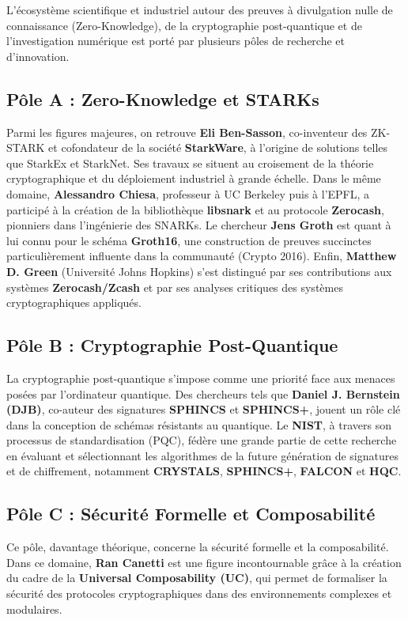 \documentclass[11pt]{article}
\begin{document}
L’écosystème scientifique et industriel autour des preuves à divulgation nulle de connaissance (Zero-Knowledge), de la cryptographie post-quantique et de l’investigation numérique est porté par plusieurs pôles de recherche et d’innovation.  

\subsection{Pôle A : Zero-Knowledge et STARKs}
Parmi les figures majeures, on retrouve \textbf{Eli Ben-Sasson}, co-inventeur des ZK-STARK et cofondateur de la société \textbf{StarkWare}, à l’origine de solutions telles que StarkEx et StarkNet. Ses travaux se situent au croisement de la théorie cryptographique et du déploiement industriel à grande échelle. Dans le même domaine, \textbf{Alessandro Chiesa}, professeur à UC Berkeley puis à l’EPFL, a participé à la création de la bibliothèque \textbf{libsnark} et au protocole \textbf{Zerocash}, pionniers dans l’ingénierie des SNARKs. Le chercheur \textbf{Jens Groth} est quant à lui connu pour le schéma \textbf{Groth16}, une construction de preuves succinctes particulièrement influente dans la communauté (Crypto 2016). Enfin, \textbf{Matthew D. Green} (Université Johns Hopkins) s’est distingué par ses contributions aux systèmes \textbf{Zerocash/Zcash} et par ses analyses critiques des systèmes cryptographiques appliqués.  

\subsection{Pôle B : Cryptographie Post-Quantique}
La cryptographie post-quantique s’impose comme une priorité face aux menaces posées par l’ordinateur quantique. Des chercheurs tels que \textbf{Daniel J. Bernstein (DJB)}, co-auteur des signatures \textbf{SPHINCS} et \textbf{SPHINCS+}, jouent un rôle clé dans la conception de schémas résistants au quantique. Le \textbf{NIST}, à travers son processus de standardisation (PQC), fédère une grande partie de cette recherche en évaluant et sélectionnant les algorithmes de la future génération de signatures et de chiffrement, notamment \textbf{CRYSTALS}, \textbf{SPHINCS+}, \textbf{FALCON} et \textbf{HQC}.  

\subsection{Pôle C : Sécurité Formelle et Composabilité}
Ce pôle, davantage théorique, concerne la sécurité formelle et la composabilité. Dans ce domaine, \textbf{Ran Canetti} est une figure incontournable grâce à la création du cadre de la \textbf{Universal Composability (UC)}, qui permet de formaliser la sécurité des protocoles cryptographiques dans des environnements complexes et modulaires.  
\end{document}
